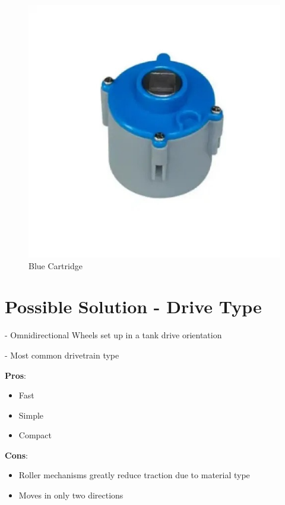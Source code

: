 \begin{figure}[hbt]
\begin{minipage}{.5\textwidth}
    \end{minipage}
    \begin{minipage}{.5\textwidth}
        \centering
        \includegraphics[width=.8\linewidth]{images/Blue-Cartridge.jpg}
        \caption{Blue Cartridge}
        \label{fig:blue-cartridge}
    \end{minipage}%
\end{figure}



\pagebreak
\section*{Possible Solution - Drive Type}


- Omnidirectional Wheels set up in a tank drive orientation 

- Most common drivetrain type

\noindent
\textbf{Pros}:
\begin{itemize}
    \item Fast
    \item Simple
    \item Compact 
\end{itemize}
\textbf{Cons}:
\begin{itemize}
    \item Roller mechanisms greatly reduce traction due to material type
    \item Moves in only two directions 
\end{itemize}

